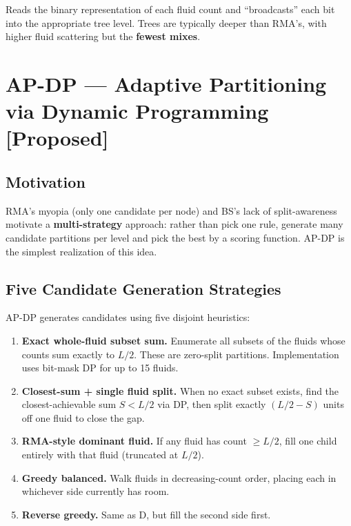 Reads the binary representation of each fluid count and ``broadcasts'' each bit into the appropriate tree level. Trees are typically deeper than RMA's, with higher fluid scattering but the \textbf{fewest mixes}.

\section{AP-DP --- Adaptive Partitioning via Dynamic Programming [Proposed]}
\label{sec:apdp_algo}

\subsection{Motivation}

RMA's myopia (only one candidate per node) and BS's lack of split-awareness motivate a \textbf{multi-strategy} approach: rather than pick one rule, generate many candidate partitions per level and pick the best by a scoring function. AP-DP is the simplest realization of this idea.

\subsection{Five Candidate Generation Strategies}

AP-DP generates candidates using five disjoint heuristics:

\begin{enumerate}
    \item[\textbf{A.}] \textbf{Exact whole-fluid subset sum.} Enumerate all subsets of the fluids whose counts sum exactly to $L/2$. These are zero-split partitions. Implementation uses bit-mask DP for up to 15 fluids.
    
    \item[\textbf{B.}] \textbf{Closest-sum + single fluid split.} When no exact subset exists, find the closest-achievable sum $S < L/2$ via DP, then split exactly $(L/2 - S)$ units off one fluid to close the gap.
    
    \item[\textbf{C.}] \textbf{RMA-style dominant fluid.} If any fluid has count $\geq L/2$, fill one child entirely with that fluid (truncated at $L/2$).
    
    \item[\textbf{D.}] \textbf{Greedy balanced.} Walk fluids in decreasing-count order, placing each in whichever side currently has room.
    
    \item[\textbf{E.}] \textbf{Reverse greedy.} Same as D, but fill the second side first.
\end{enumerate}

